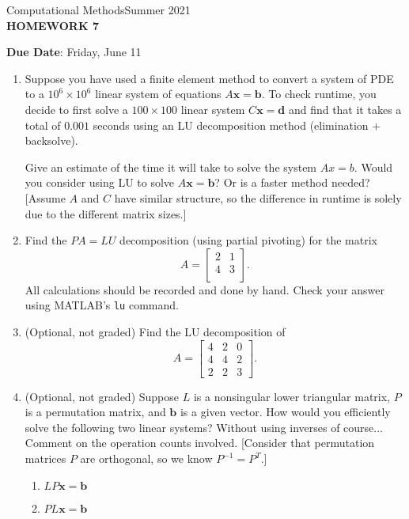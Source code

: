 \documentclass[12pt]{article}
\begin{document}
\begin{center}
Computational Methods\qquad Summer 2021
\\

\textbf{\large HOMEWORK 7}\\
\end{center}
\noindent \textbf{Due Date}: Friday, June 11\\

\begin{enumerate}
\item Suppose you have used a finite element method to convert a system of PDE to a $10^6\times 10^6$ linear system of equations $A\textbf{x}=\textbf{b}$. To check runtime, you decide to first solve a $100\times 100$ linear system $C\textbf{x}=\textbf{d}$ and find that it takes a total of $0.001$ seconds using an LU decomposition method (elimination $+$ backsolve). 

Give an estimate of the time it will take to solve the system $Ax=b$. Would you consider using LU to solve $A\textbf{x}=\textbf{b}$? Or is a faster method needed? 
[Assume $A$ and $C$ have similar structure, so the difference in runtime is solely due to the different matrix sizes.]
\item Find the $PA=LU$ decomposition (using partial pivoting) for the matrix
	\[\displaystyle{A = \begin{bmatrix}
    2 & 1 \\
    4 & 3 \\
	\end{bmatrix}}.\]
All calculations should be recorded and done by hand. Check your answer using MATLAB's \texttt{lu} command.
\item (Optional, not graded) Find the LU decomposition of 
	\[\displaystyle{A = \begin{bmatrix}
    4 & 2 & 0\\
    4 & 4 & 2 \\
    2 & 2 & 3
	\end{bmatrix}}.\]
\item (Optional, not graded) Suppose $L$ is a nonsingular lower triangular matrix, $P$ is a permutation matrix, and $\textbf{b}$ is a given vector. How would you efficiently solve the following two linear systems? Without using inverses of course... Comment on the operation counts involved. [Consider that permutation matrices $P$ are orthogonal, so we know $P^{-1}=P^T$.]
	\begin{enumerate}
	\item $LP\textbf{x}=\textbf{b}$
	\item $PL\textbf{x}=\textbf{b}$
	\end{enumerate}
\end{enumerate}
\end{document}
